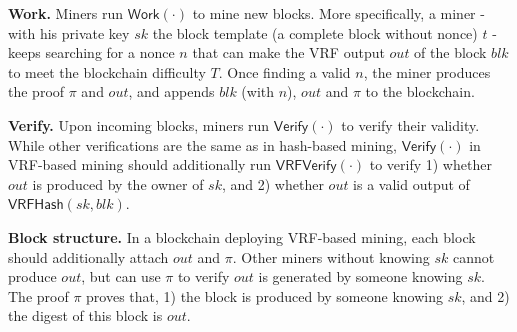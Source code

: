 \textbf{Work.}
Miners run $\mathsf{Work}(\cdot)$ to mine new blocks.
More specifically, a miner - with his private key $sk$ the block template (a complete block without nonce) $t$ - keeps searching for a nonce $n$ that can make the VRF output $out$ of the block $blk$ to meet the blockchain difficulty $T$.
Once finding a valid $n$, the miner produces the proof $\pi$ and $out$, and appends $blk$ (with $n$), $out$ and $\pi$ to the blockchain.

\textbf{Verify.}
Upon incoming blocks, miners run $\mathsf{Verify}(\cdot)$ to verify their validity.
While other verifications are the same as in hash-based mining, $\mathsf{Verify}(\cdot)$ in VRF-based mining should additionally run $\mathsf{VRFVerify}(\cdot)$ to verify 1) whether $out$ is produced by the owner of $sk$, and 2) whether $out$ is a valid output of $\mathsf{VRFHash}(sk, blk)$.

\textbf{Block structure.}
In a blockchain deploying VRF-based mining, each block should additionally attach $out$ and $\pi$.
Other miners without knowing $sk$ cannot produce $out$, but can use $\pi$ to verify $out$ is generated by someone knowing $sk$.
The proof $\pi$ proves that, 1) the block is produced by someone knowing $sk$, and 2) the digest of this block is $out$.